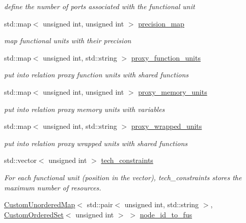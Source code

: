 \begin{DoxyCompactItemize}
\begin{DoxyCompactList}\small\item\em define the number of ports associated with the functional unit \end{DoxyCompactList}\item 
std\+::map$<$ unsigned int, unsigned int $>$ \hyperlink{classAllocationInformation_aa7d7d28f9c85cd5ce7b96e6ae111b31e}{precision\+\_\+map}
\begin{DoxyCompactList}\small\item\em map functional units with their precision \end{DoxyCompactList}\item 
std\+::map$<$ unsigned int, std\+::string $>$ \hyperlink{classAllocationInformation_a4243b840b6c6b552518720eab142d881}{proxy\+\_\+function\+\_\+units}
\begin{DoxyCompactList}\small\item\em put into relation proxy function units with shared functions \end{DoxyCompactList}\item 
std\+::map$<$ unsigned int, unsigned int $>$ \hyperlink{classAllocationInformation_af14479ed900999853f11bf37bece6c74}{proxy\+\_\+memory\+\_\+units}
\begin{DoxyCompactList}\small\item\em put into relation proxy memory units with variables \end{DoxyCompactList}\item 
std\+::map$<$ unsigned int, std\+::string $>$ \hyperlink{classAllocationInformation_af1df73d0bdd2211d14307912ead7ee5c}{proxy\+\_\+wrapped\+\_\+units}
\begin{DoxyCompactList}\small\item\em put into relation proxy wrapped units with shared functions \end{DoxyCompactList}\item 
std\+::vector$<$ unsigned int $>$ \hyperlink{classAllocationInformation_aa942e185b32ca21fc8a7fcfd99d30d94}{tech\+\_\+constraints}
\begin{DoxyCompactList}\small\item\em For each functional unit (position in the vector), tech\+\_\+constraints stores the maximum number of resources. \end{DoxyCompactList}\item 
\hyperlink{custom__map_8hpp_ad1ed68f2ff093683ab1a33522b144adc}{Custom\+Unordered\+Map}$<$ std\+::pair$<$ unsigned int, std\+::string $>$, \hyperlink{classCustomOrderedSet}{Custom\+Ordered\+Set}$<$ unsigned int $>$ $>$ \hyperlink{classAllocationInformation_aa3c7326d3edf9247e81a30e79233f76d}{node\+\_\+id\+\_\+to\+\_\+fus}

\end{DoxyCompactItemize}
